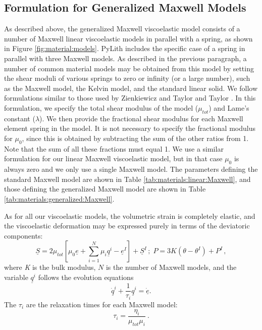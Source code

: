 \subsection{Formulation for Generalized Maxwell Models}
\label{sec:materials:formulation:generalized:Maxwell}

As described above, the generalized Maxwell viscoelastic model consists
of a number of Maxwell linear viscoelastic models in parallel with
a spring, as shown in Figure \vref{fig:material:models}. PyLith includes
the specific case of a spring in parallel with three Maxwell models.
As described in the previous paragraph, a number of common material
models may be obtained from this model by setting the shear moduli
of various springs to zero or infinity (or a large number), such as
the Maxwell model, the Kelvin model, and the standard linear solid.
We follow formulations similar to those used by Zienkiewicz and Taylor
\cite{Zienkiewicz:Taylor:2000} and Taylor \cite{Taylor:2003}. In
this formulation, we specify the total shear modulus of the model
($\mu_{tot}$) and Lame's constant ($\lambda$). We then provide the
fractional shear modulus for each Maxwell element spring in the model.
It is not necessary to specify the fractional modulus for $\mu_{0}$,
since this is obtained by subtracting the sum of the other ratios
from 1. Note that the sum of all these fractions must equal 1. We
use a similar formulation for our linear Maxwell viscoelastic model,
but in that case $\mu_{0}$ is always zero and we only use a single
Maxwell model. The parameters defining the standard Maxwell model
are shown in Table \vref{tab:materials:linear:Maxwell}, and those defining the
generalized Maxwell model are shown in Table \vref{tab:materials:generalized:Maxwell}.

As for all our viscoelastic models, the volumetric strain is completely
elastic, and the viscoelastic deformation may be expressed purely
in terms of the deviatoric components:
\begin{equation}
\underline{S}=2\mu_{tot}\left[\mu_{0}\underline{e}+\sum_{i=1}^{N}\mu_{i}\underline{q}^{i}-\underline{e}^{I}\right]+\underline{S}^{I}\,;\; P=3K\left(\theta-\theta^{I}\right)+P^{I}\,,\label{eq:19}
\end{equation}
where \textsl{K} is the bulk modulus, $N$ is the number of Maxwell
models, and the variable $\underline{q}^{i}$ follows the evolution
equations
\begin{equation}
\underline{\dot{q}}^{i}+\frac{1}{\tau_{i}}\underline{q}^{i}=\underline{\dot{e}}.\label{eq:20}
\end{equation}
The $\tau_{i}$ are the relaxation times for each Maxwell model:
\begin{equation}
\tau_{i}=\frac{\eta_{i}}{\mu_{tot}\mu_{i}}\:.\label{eq:21-1}
\end{equation}

